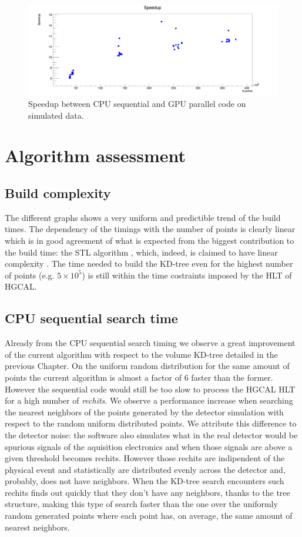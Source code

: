 \begin{figure}
\includegraphics[width=\textwidth]{rechits/Speedup.png}
\caption{Speedup between CPU sequential and GPU parallel code on simulated data.}
\label{fkdtree_speedup}
\end{figure}
\clearpage

\section{Algorithm assessment}
\subsection{Build complexity}
The different graphs shows a very uniform and predictible trend of the build times. The dependency of the timings with the number of points is clearly linear which is in good agreement of what is expected from the biggest contribution to the build time: the STL algorithm , which, indeed, is claimed to have linear complexity \cite{iso_stl}. The time needed to build the KD-tree even for the highest number of points (e.g. $5 \times 10^5$) is still within the time costraints imposed by the HLT of HGCAL.

\subsection{CPU sequential search time}
Already from the CPU sequential search timing we observe a great improvement of the current algorithm with respect to the volume KD-tree detailed in the previous Chapter. On the uniform random distribution for the same amount of points the current algorithm is almost a factor of 6 faster than the former.
However the sequential code would still be too slow to process the HGCAL HLT for a high number of \textit{rechits}. We observe a performance increase when searching the nearest neighbors of the points generated by the detector simulation with respect to the random uniform distributed points. We attribute this difference to the detector noise: the software also simulates what in the real detector would be spurious signals of the aquisition electronics and when those signals are above a given threshold becomes rechits. However those rechits are indipendent of the physical event and statistically are distributed evenly across the detector and, probably, does not have neighbors. When the KD-tree search encounters such rechits finds out quickly that they don't have any neighbors, thanks to the tree structure, making this type of search faster than the one over the uniformly random generated points where each point has, on average, the same amount of nearest neighbors.


